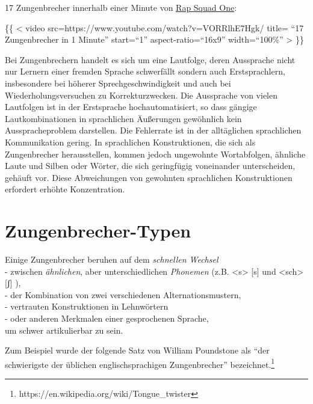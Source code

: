 \documentclass[
  letterpaper,
]{scrbook}
\begin{document}
17 Zungenbrecher innerhalb einer Minute von
\href{https://www.youtube.com/watch?v=VORRlhE7Hgk}{Rap Squad One}:

\{\{ \textless{} video src=https://www.youtube.com/watch?v=VORRlhE7Hgk/
title= ``17 Zungenbrecher in 1 Minute'' start=``1''
aspect-ratio=``16x9'' width=``100\%'' \textgreater{} \}\}

Bei Zungenbrechern handelt es sich um eine Lautfolge, deren Aussprache
nicht nur Lernern einer fremden Sprache schwerfällt sondern auch
Erstsprachlern, insbesondere bei höherer Sprechgeschwindigkeit und auch
bei Wiederholungsversuchen zu Korrekturzwecken. Die Aussprache von
vielen Lautfolgen ist in der Erstsprache hochautomatisiert, so dass
gängige Lautkombinationen in sprachlichen Äußerungen gewöhnlich kein
Ausspracheproblem darstellen. Die Fehlerrate ist in der alltäglichen
sprachlichen Kommunikation gering. In sprachlichen Konstruktionen, die
sich als Zungenbrecher herausstellen, kommen jedoch ungewohnte
Wortabfolgen, ähnliche Laute und Silben oder Wörter, die sich
geringfügig voneinander unterscheiden, gehäuft vor. Diese Abweichungen
von gewohnten sprachlichen Konstruktionen erfordert erhöhte
Konzentration.

\hypertarget{zungenbrecher-typen}{%
\section{Zungenbrecher-Typen}\label{zungenbrecher-typen}}

Einige Zungenbrecher beruhen auf dem \emph{schnellen Wechsel}\\
- zwischen \emph{ähnlichen}, aber unterschiedlichen \emph{Phonemen}
(z.B. \textless s\textgreater{} {[}s{]} und \textless sch\textgreater{}
{[}ʃ{]} ),\\
- der Kombination von zwei verschiedenen Alternationsmustern,\\
- vertrauten Konstruktionen in Lehnwörtern\\
- oder anderen Merkmalen einer gesprochenen Sprache,\\
um schwer artikulierbar zu sein.

Zum Beispiel wurde der folgende Satz von William Poundstone als ``der
schwierigste der üblichen englischsprachigen Zungenbrecher''
bezeichnet.\footnote{https://en.wikipedia.org/wiki/Tongue\_twister}
\end{document}
